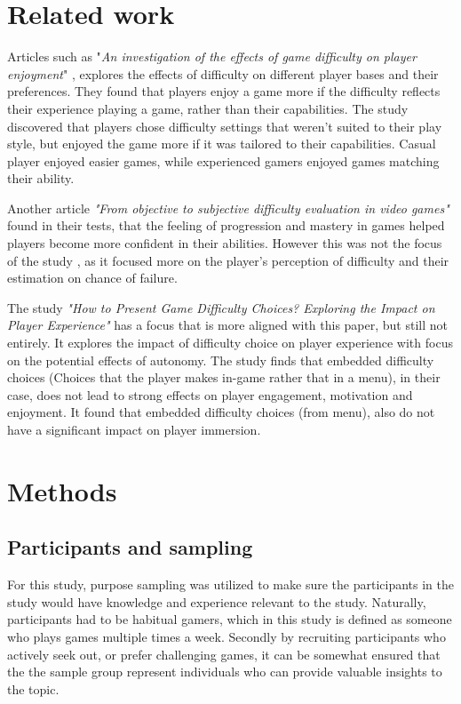 \section{Related work}


Articles such as "\textit{An investigation of the effects of game difficulty on player enjoyment}" \cite{justin_t_alexander_investigation_2025}, explores the effects of difficulty on different player bases and their preferences. They found that players enjoy a game more if the difficulty reflects their experience playing a game, rather than their capabilities. The study discovered that players chose difficulty settings that weren't suited to their play style, but enjoyed the game more if it was tailored to their capabilities. Casual player enjoyed easier games, while experienced gamers enjoyed games matching their ability.

Another article \textit{"From objective to subjective difficulty evaluation in video games"}\cite{constant_objective_2017} found in their tests, that the feeling of progression and mastery in games helped players become more confident in their abilities. However this was not the focus of the study \cite{constant_objective_2017}, as it focused more on the player's perception of difficulty and their estimation on chance of failure. 

The study \textit{"How to Present Game Difficulty Choices? Exploring the Impact on Player Experience"} \cite{jan_d_smeddinck_how_2016} has a focus that is more aligned with this paper, but still not entirely. It explores the impact of difficulty choice on player experience with focus on the potential effects of autonomy. The study finds that embedded difficulty choices (Choices that the player makes in-game rather that in a menu), in their case, does not lead to strong effects on player engagement, motivation and enjoyment. It found that embedded difficulty choices (from menu), also do not have a significant impact on player immersion. 


\section{Methods}

\subsection{Participants and sampling}
For this study, purpose sampling was utilized to make sure the participants in the study would have knowledge and experience relevant to the study. Naturally, participants had to be habitual gamers, which in this study is defined as someone who plays games multiple times a week. Secondly by recruiting participants who actively seek out, or prefer challenging games, it can be somewhat ensured that the the sample group represent individuals who can provide valuable insights to the topic.

